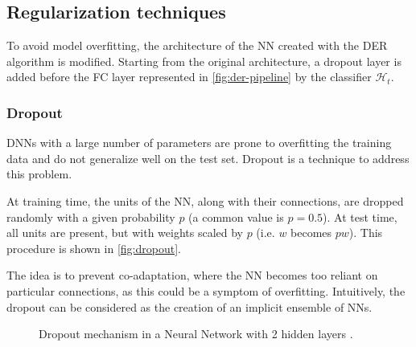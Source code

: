 \subsection{Regularization techniques}
To avoid model overfitting, the architecture of the NN created with the DER algorithm is modified.
Starting from the original architecture, a dropout layer is added before the FC layer represented in \autoref{fig:der-pipeline} by the classifier $\mathcal{H}_t$.

\subsubsection{Dropout}
\label{sec:methods-dropout}
DNNs with a large number of parameters are prone to overfitting the training data and do not generalize well on the test set.
Dropout \cite{srivastava2014dropout} is a technique to address this problem.

At training time, the units of the NN, along with their connections, are dropped randomly with a given probability $p$ (a common value is $p = 0.5$). At test time, all units are present, but with weights scaled by $p$ (i.e. $w$ becomes $pw$). This procedure is shown in \autoref{fig:dropout}.

The idea is to prevent co-adaptation, where the NN becomes too reliant on particular connections, as this could be a symptom of overfitting. Intuitively, the dropout can be considered as the creation of an implicit ensemble of NNs.

\begin{figure}%
	\centering
	\hspace*{2cm}
	\caption{Dropout mechanism in a Neural Network with 2 hidden layers \cite{srivastava2014dropout}.}%
	\label{fig:dropout}%
\end{figure}

